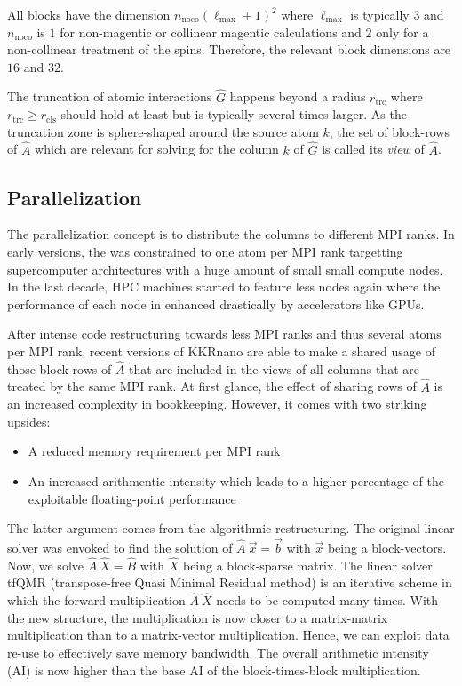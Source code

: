 \documentclass[a4paper]{article}
\newcommand{\MPIrank}{MPI rank} %
\newcommand{\um}[1]{_{\mathrm{#1}}}
\begin{document}
All blocks have the dimension $n\um{noco}(\ell\um{max} + 1)^2$
where $\ell\um{max}$ is typically $3$ and $n\um{noco}$ is $1$
for non-magentic or collinear magentic calculations 
and $2$ only for a non-collinear treatment of the spins.
Therefore, the relevant block dimensions are $16$ and $32$.

The truncation of atomic interactions $\hat G$ happens beyond a radius $r\um{trc}$
where $r\um{trc} \geq r\um{cls}$ should hold at least but is typically several times larger.
As the truncation zone is sphere-shaped around the source atom $k$, 
the set of block-rows of $\hat A$ which are relevant
for solving for the column $k$ of $\hat G$ is called its \emph{view} of $\hat A$.

\subsection{Parallelization}

The parallelization concept is to distribute the columns to different \MPIrank{}s.
In early versions, the was constrained to one atom per \MPIrank{} targetting supercomputer
architectures with a huge amount of small small compute nodes. 
In the last decade, HPC machines started to feature less nodes again 
where the performance of each node in enhanced drastically by accelerators like GPUs.

After intense code restructuring towards less \MPIrank{}s and thus several atoms per \MPIrank{}, %
recent versions of KKRnano are able to make a shared usage of those block-rows of $\hat A$
that are included in the views of all columns that are treated by the same \MPIrank{}.
At first glance, the effect of sharing rows of $\hat A$ is an increased complexity
in bookkeeping. However, it comes with two striking upsides:
\begin{itemize}
 \item A reduced  memory requirement per \MPIrank{}
 \item An increased arithmentic intensity which leads to a higher percentage of the exploitable floating-point performance
\end{itemize}
The latter argument comes from the algorithmic restructuring.
The original linear solver was envoked to find the solution of 
$\hat A \ \vec x = \vec b$ with $\vec x$ being a block-vectors.
Now, we solve $\hat A \ \hat X = \hat B$ with $\hat X$ being a block-sparse matrix.
The linear solver tfQMR (transpose-free Quasi Minimal Residual method)
is an iterative scheme in which the forward multiplication $\hat A \ \hat X$
needs to be computed many times.
With the new structure, the multiplication is now closer to a matrix-matrix multiplication
than to a matrix-vector multiplication. Hence, we can exploit data re-use to effectively
save memory bandwidth. 
The overall arithmetic intensity (AI) is now higher than the base AI of the block-times-block multiplication.
\end{document}
